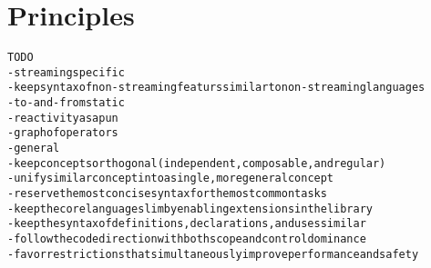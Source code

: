 \section{Principles}\label{sec:principles}

\begin{alltt}TODO\scriptsize
- streaming specific
  - keep syntax of non-streaming featurs similar to non-streaming languages
  - to-and-from static
  - reactivity as a pun
  - graph of operators
- general
  - keep concepts orthogonal (independent, composable, and regular)
  - unify similar concept into a single, more general concept
  - reserve the most concise syntax for the most common tasks
  - keep the core language slim by enabling extensions in the library
  - keep the syntax of definitions, declarations, and uses similar
  - follow the code direction with both scope and control dominance
  - favor restrictions that simultaneously improve performance and safety
\end{alltt}
